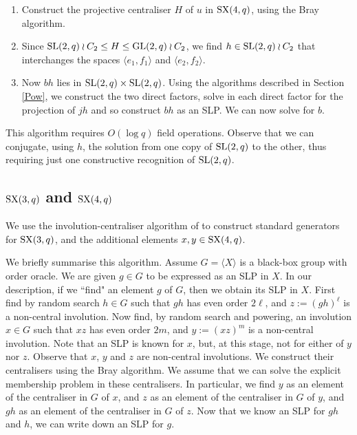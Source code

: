 \documentclass[12pt]{article}
\def\SL{{\rm SL}}
\def\GL{{\rm GL}}
\def\SX{{\rm SX}}
\begin{document}
\begin{enumerate}
\item 
Construct the projective
centraliser $H$ of $u$ in $\SX(4,q)$, using the Bray algorithm. 

\item 
Since $\SL(2,q)\wr C_2 \leq H \leq \GL(2, q) \wr C_2$,  
we find $h\in\SL(2,q)\wr C_2$ that
interchanges the spaces $\langle e_1,f_1\rangle$ and $\langle
e_2,f_2\rangle$. 

\item Now $bh$ lies in $\SL(2,q)\times\SL(2,q)$.  Using the
algorithms described in Section \ref{Pow}, 
we construct the two direct factors, solve in each
direct factor for the projection of $jh$ and so 
construct $bh$ as an SLP.  
We can now solve for $b$.
\end{enumerate}
This algorithm requires $O(\log q)$ field operations.
Observe that we can conjugate, using $h$, the solution from one 
copy of $\SL(2, q)$ to the other, thus 
requiring just one constructive recognition of $\SL(2, q)$.

\subsection{$\SX(3, q)$ and $\SX(4, q)$}
\label{ryba-base}
We use the involution-centraliser algorithm of \cite{Ryba-paper}
to construct standard generators for $\SX(3,q)$, and the additional
elements $x, y \in \SX(4, q)$.  

We briefly summarise this algorithm.  
Assume $G = \langle X \rangle$ is a black-box group
with order oracle. We are given 
$g \in G$ to  be expressed as an SLP in $X$.
In our description, if we ``find" an element $g$ of $G$, then we 
obtain its SLP in $X$.
First find by random search $h\in G$ such that
$gh$ has even order $2\ell$, and $z:=(gh)^\ell$ is a non-central
involution. Now  find, by random search and powering, an involution
$x\in G$ such that $xz$ has even order $2m$, and $y:=(xz)^m$ is a
non-central involution. Note that an SLP is known for $x$, but, at this
stage, not for either of $y$ nor $z$. 
Observe that $x$, $y$ and $z$ are non-central involutions. 
We construct their centralisers using the Bray algorithm.
We assume that we can  solve the explicit membership problem 
in these centralisers.
In particular, we find $y$ as an element of the centraliser in $G$ of $x$, 
and $z$ as an
element of the centraliser in $G$ of $y$, and $gh$ as an element of the
centraliser in $G$ of $z$. Now that we know an SLP for $gh$ and 
$h$, we can write down an SLP for $g$.
\end{document}
